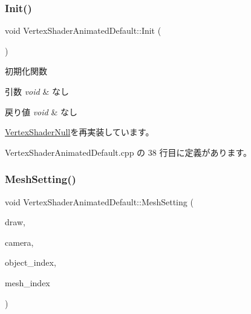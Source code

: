 \subsubsection{\texorpdfstring{Init()}{Init()}}
{\footnotesize\ttfamily void Vertex\+Shader\+Animated\+Default\+::\+Init (\begin{DoxyParamCaption}{ }\end{DoxyParamCaption})\hspace{0.3cm}{\ttfamily [virtual]}}



初期化関数 


\begin{DoxyParams}{引数}
{\em void} & なし \\
\hline
\end{DoxyParams}

\begin{DoxyRetVals}{戻り値}
{\em void} & なし \\
\hline
\end{DoxyRetVals}


\mbox{\hyperlink{class_vertex_shader_null_a4d79b358dab49c840345d74823a16840}{Vertex\+Shader\+Null}}を再実装しています。



 Vertex\+Shader\+Animated\+Default.\+cpp の 38 行目に定義があります。

\mbox{\label{class_vertex_shader_animated_default_ad19fa307106654c4e8337db832018cc6}} 
\subsubsection{\texorpdfstring{Mesh\+Setting()}{MeshSetting()}}
{\footnotesize\ttfamily void Vertex\+Shader\+Animated\+Default\+::\+Mesh\+Setting (\begin{DoxyParamCaption}\item[{\mbox{\hyperlink{class_draw_base}{Draw\+Base}} $\ast$}]{draw,  }\item[{\mbox{\hyperlink{class_camera}{Camera}} $\ast$}]{camera,  }\item[{unsigned}]{object\+\_\+index,  }\item[{unsigned}]{mesh\+\_\+index }\end{DoxyParamCaption})\hspace{0.3cm}{\ttfamily [virtual]}}



